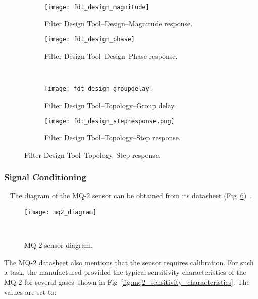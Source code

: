 \begin{figure}[H]
    \centering
    \begin{subfigure}[t]{0.9\textwidth}
        \centering
        \texttt{[image: fdt\_design\_magnitude]}
        \caption{Filter Design Tool--Design--Magnitude response.}
        \label{fig:fdt_design:magnitude}
    \end{subfigure}
    \begin{subfigure}[t]{0.9\textwidth}
        \centering
        \texttt{[image: fdt\_design\_phase]}
        \caption{Filter Design Tool--Design--Phase response.}
        \label{fig:fdt_design:phase}
    \end{subfigure}
    \\
    \centering
    \begin{subfigure}[t]{0.9\textwidth}
        \centering
        \texttt{[image: fdt\_design\_groupdelay]}
        \caption{Filter Design Tool--Topology--Group delay.}
        \label{fig:fdt_design:group_delay}
    \end{subfigure}
    \begin{subfigure}[t]{0.9\textwidth}
        \centering
        \texttt{[image: fdt\_design\_stepresponse.png]}
        \caption{Filter Design Tool--Topology--Step response.}
        \label{fig:fdt_design:step_response}
    \end{subfigure}
    \label{fig:fdt_design}
\end{figure}


\subsubsection{Signal Conditioning}
~\label{sec:methodology:dev_methodology:sc}
\hspace{8pt}
The diagram of the MQ-2 sensor can be obtained from its datasheet (Fig~\ref{fig:mq2_diagram})~\cite{mq2_datasheet}.

\begin{figure}[H]
    \centering
    \texttt{[image: mq2\_diagram]}
    \caption{MQ-2 sensor diagram.}
~\label{fig:mq2_diagram}
\end{figure}

The MQ-2 datasheet also mentions that the sensor requires calibration. For such a task, the manufactured provided the typical sensitivity characteristics of the MQ-2 for several gases--shown in Fig~\ref{fig:mq2_sensitivity_characteristics}. The values are set to:

